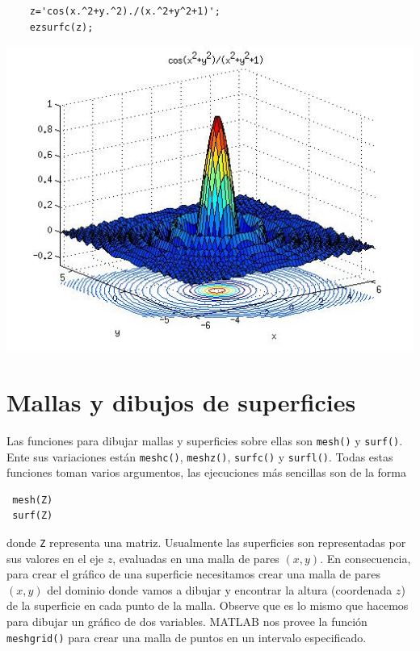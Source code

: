 \documentclass[11pt]{article}
\begin{document}
\begin{enumerate}
\begin{minipage}{0.4\textwidth}
      \begin{verbatim}
	z='cos(x.^2+y.^2)./(x.^2+y^2+1)';
	ezsurfc(z);
      \end{verbatim}
\end{minipage}
\begin{minipage}{0.5\textwidth}
      \begin{center}
      \includegraphics[width=\textwidth]{./ej4.jpg}
      \end{center}
\end{minipage}
\end{enumerate}

\section{Mallas y dibujos de superficies}
Las funciones para dibujar mallas y superficies sobre ellas son \texttt{mesh()} y \texttt{surf()}. 
Ente sus variaciones est\'an \texttt{meshc()}, \texttt{meshz()}, \texttt{surfc()} y \texttt{surfl()}. 
Todas estas funciones toman varios argumentos, las ejecuciones m\'as sencillas son de la forma 
\begin{verbatim}
 mesh(Z)
 surf(Z)
\end{verbatim}
donde \texttt{Z} representa una matriz. Usualmente las superficies son representadas por sus valores
en el eje $z$, evaluadas en una malla de pares $(x,y)$. En consecuencia, para crear el gr\'afico 
de una superficie necesitamos crear una malla de pares $(x,y)$ del dominio donde vamos a dibujar y encontrar 
la altura (coordenada $z$) de la superficie en cada punto de la malla. Observe que es lo mismo 
que hacemos para dibujar un gr\'afico de dos variables. MATLAB nos provee la funci\'on \texttt{meshgrid()} 
para crear una malla de puntos en un intervalo especificado.
\end{document}
